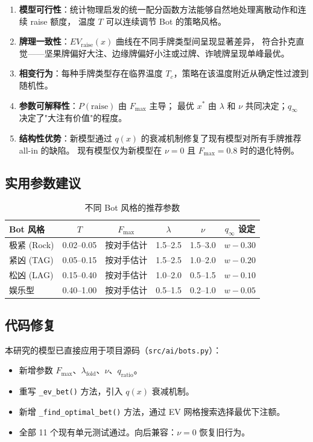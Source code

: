 \documentclass[12pt,a4paper]{ctexart}
\begin{document}
\begin{enumerate}[label=(\arabic*)]
    \item \textbf{模型可行性}：统计物理启发的统一配分函数方法能够自然地处理离散动作和连续 raise 额度，
          温度 $T$ 可以连续调节 Bot 的策略风格。
    \item \textbf{牌理一致性}：$EV_{\text{raise}}(x)$ 曲线在不同手牌类型间呈现显著差异，
          符合扑克直觉——坚果牌偏好大注、边缘牌偏好小注或过牌、诈唬牌呈现单峰最优。
    \item \textbf{相变行为}：每种手牌类型存在临界温度 $T_c$，策略在该温度附近从确定性过渡到随机性。
    \item \textbf{参数可解释性}：$P(\text{raise})$ 由 $F_{\max}$ 主导；
          最优 $x^*$ 由 $\lambda$ 和 $\nu$ 共同决定；$q_{\infty}$ 决定了"大注有价值"的程度。
    \item \textbf{结构性优势}：新模型通过 $q(x)$ 的衰减机制修复了现有模型对所有手牌推荐 all-in 的缺陷。
          现有模型仅为新模型在 $\nu=0$ 且 $F_{\max}=0.8$ 时的退化特例。
\end{enumerate}

\subsection{实用参数建议}

\begin{table}[H]
\centering
\caption{不同 Bot 风格的推荐参数}
\begin{tabular}{@{}lccccc@{}}
\toprule
\textbf{Bot 风格} & $T$ & $F_{\max}$ & $\lambda$ & $\nu$ & $q_{\infty}$ 设定 \\
\midrule
极紧 (Rock)    & 0.02--0.05 & 按对手估计 & 1.5--2.5 & 1.5--3.0 & $w - 0.30$ \\
紧凶 (TAG)     & 0.05--0.15 & 按对手估计 & 1.5--2.5 & 1.0--2.0 & $w - 0.20$ \\
松凶 (LAG)     & 0.15--0.40 & 按对手估计 & 1.0--2.0 & 0.5--1.5 & $w - 0.10$ \\
娱乐型          & 0.40--1.00 & 按对手估计 & 0.5--1.5 & 0.2--1.0 & $w - 0.05$ \\
\bottomrule
\end{tabular}
\end{table}

\subsection{代码修复}

本研究的模型已直接应用于项目源码（\texttt{src/ai/bots.py}）：
\begin{itemize}
    \item 新增参数 $F_{\max}$、$\lambda_{\text{fold}}$、$\nu$、$q_{\text{ratio}}$。
    \item 重写 \texttt{\_ev\_bet()} 方法，引入 $q(x)$ 衰减机制。
    \item 新增 \texttt{\_find\_optimal\_bet()} 方法，通过 EV 网格搜索选择最优下注额。
    \item 全部 11 个现有单元测试通过。向后兼容：$\nu=0$ 恢复旧行为。
\end{itemize}
\end{document}
